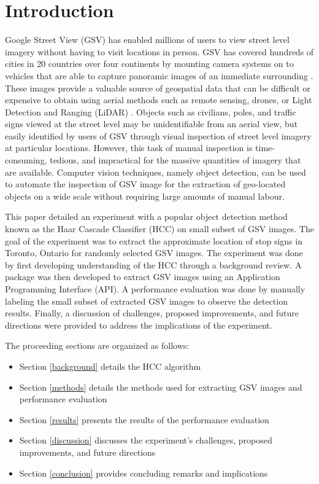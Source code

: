 \section{Introduction} \label{introduction}

 Google Street View (GSV) has enabled millions of users to view street level imagery without having to visit locations in person. GSV has covered hundreds of cities in 20 countries over four continents by mounting camera systems on to vehicles that are able to capture panoramic images of an immediate surrounding \cite{Anguelov:2010}. These images provide a valuable source of geospatial data that can be difficult or expensive to obtain using aerial methods such as remote sensing, drones, or Light Detection and Ranging (LiDAR) \cite{Watts:2012}. Objects such as civilians, poles, and traffic signs viewed at the street level may be unidentifiable from an aerial view, but easily identified by users of GSV through visual inspection of street level imagery at particular locations. However, this task of manual inspection is time-consuming, tedious, and impractical for the massive quantities of imagery that are available. Computer vision techniques, namely object detection, can be used to automate the inspection of GSV image for the extraction of geo-located objects on a wide scale without requiring large amounts of manual labour.
 
 This paper detailed an experiment with a popular object detection method known as the Haar Cascade Classifier (HCC) on small subset of GSV images. The goal of the experiment was to extract the approximate location of stop signs in Toronto, Ontario for randomly selected GSV images. The experiment was done by first developing understanding of the HCC through a background review. A package was then developed to extract GSV images using an Application Programming Interface (API). A performance evaluation was done by manually labeling the small subset of extracted GSV images to observe the detection results. Finally, a discussion of challenges, proposed improvements, and future directions were provided to address the implications of the experiment.
 
 The proceeding sections are organized as follows:
 
\begin{itemize}
  \item Section \ref{background} details the HCC algorithm
  \item Section \ref{methods} details the methods used for extracting GSV images and performance evaluation
  \item Section \ref{results} presents the results of the performance evaluation
  \item Section \ref{discussion} discusses the experiment's challenges, proposed improvements, and future directions
  \item Section \ref{conclusion} provides concluding remarks and implications
\end{itemize}
 
